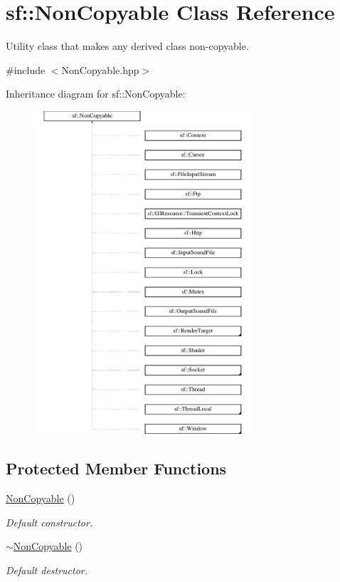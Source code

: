 \hypertarget{classsf_1_1_non_copyable}{}\section{sf\+:\+:Non\+Copyable Class Reference}
\label{classsf_1_1_non_copyable}


Utility class that makes any derived class non-\/copyable.  




{\ttfamily \#include $<$Non\+Copyable.\+hpp$>$}

Inheritance diagram for sf\+:\+:Non\+Copyable\+:\begin{figure}[H]
\begin{center}
\leavevmode
\includegraphics[height=12.000000cm]{classsf_1_1_non_copyable}
\end{center}
\end{figure}
\subsection*{Protected Member Functions}
\begin{DoxyCompactItemize}
\item 
\mbox{\hyperlink{classsf_1_1_non_copyable_a2110add170580fdb946f887719da6860}{Non\+Copyable}} ()
\begin{DoxyCompactList}\small\item\em Default constructor. \end{DoxyCompactList}\item 
\mbox{\hyperlink{classsf_1_1_non_copyable_a8274ffbf46014f5f7f364befb52c7728}{$\sim$\+Non\+Copyable}} ()
\begin{DoxyCompactList}\small\item\em Default destructor. \end{DoxyCompactList}\end{DoxyCompactItemize}
